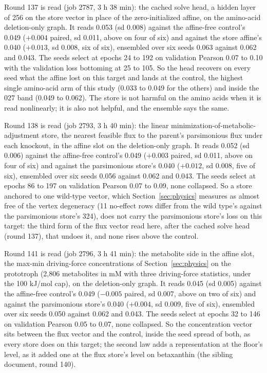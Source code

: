 Round 137 is read (job 2787, 3 h 38 min): the cached solve head, a hidden layer of 256
on the store vector in place of the zero-initialized affine, on the amino-acid
deletion-only graph. It reads 0.053 (sd 0.008) against the affine-free control's 0.049
($+0.004$ paired, sd 0.011, above on four of six) and against the store affine's 0.040
($+0.013$, sd 0.008, six of six), ensembled over six seeds 0.063 against 0.062 and
0.043. The seeds select at epochs 24 to 192 on validation Pearson 0.07 to 0.10 with the
validation loss bottoming at 25 to 105. So the head recovers on every seed what the
affine lost on this target and lands at the control, the highest single amino-acid arm
of this study (0.033 to 0.049 for the others) and inside the 027 band (0.049 to 0.062).
The store is not harmful on the amino acids when it is read nonlinearly; it is also not
helpful, and the ensemble says the same.

Round 138 is read (job 2793, 3 h 40 min): the linear minimization-of-metabolic-adjustment
store, the nearest feasible flux to the parent's parsimonious flux under each knockout,
in the affine slot on the deletion-only graph. It reads 0.052 (sd 0.006) against the
affine-free control's 0.049 ($+0.003$ paired, sd 0.011, above on four of six) and
against the parsimonious store's 0.040 ($+0.012$, sd 0.008, five of six), ensembled
over six seeds 0.056 against 0.062 and 0.043. The seeds select at epochs 86 to 197 on
validation Pearson 0.07 to 0.09, none collapsed. So a store anchored to one wild-type
vector, which Section~\ref{sec:physics} measures as almost free of the vertex
degeneracy (11 no-effect rows differ from the wild type's against the parsimonious
store's 324), does not carry the parsimonious store's loss on this target: the third
form of the flux vector read here, after the cached solve head (round 137), that
undoes it, and none rises above the control.

Round 141 is read (job 2796, 3 h 41 min): the metabolite side in the affine slot, the
max-min driving-force concentrations of Section~\ref{sec:physics} on the prototroph
(2,806 metabolites in mM with three driving-force statistics, under the 100 kJ/mol
cap), on the deletion-only graph. It reads 0.045 (sd 0.005) against the affine-free
control's 0.049 ($-0.005$ paired, sd 0.007, above on two of six) and against the
parsimonious store's 0.040 ($+0.004$, sd 0.009, five of six), ensembled over six seeds
0.050 against 0.062 and 0.043. The seeds select at epochs 32 to 146 on validation
Pearson 0.05 to 0.07, none collapsed. So the concentration vector sits between the
flux vector and the control, inside the seed spread of both, as every store does on
this target; the second law adds a representation at the floor's level, as it added
one at the flux store's level on betaxanthin (the sibling document, round 140).

